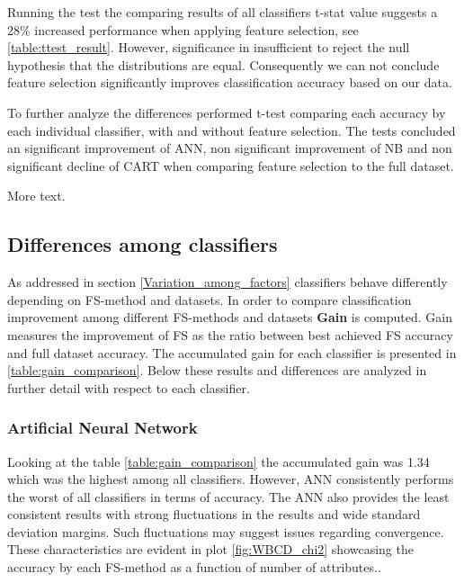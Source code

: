 

Running the test the comparing results of all classifiers t-stat value suggests a 28\% increased performance when applying feature selection, see \ref{table:ttest_result}. However, significance in insufficient to reject the null hypothesis that the distributions are equal. Consequently we can not conclude feature selection significantly improves classification accuracy based on our data.

To further analyze the differences performed t-test comparing each accuracy by each individual classifier, with and without feature selection. The tests concluded an significant improvement of ANN, non significant improvement of NB and non significant decline of CART when comparing feature selection to the full dataset.

More text.

\subsection{Differences among classifiers}

As addressed in section \ref{Variation_among_factors} classifiers behave differently depending on FS-method and datasets.
In order to compare classification improvement among different FS-methods and datasets \textbf{Gain} is computed. Gain measures the improvement of FS as the ratio between best achieved FS accuracy and full dataset accuracy. The accumulated gain for each classifier is presented in \ref{table:gain_comparison}. Below these results and differences are analyzed in further detail with respect to each classifier.

\begin{table}[hp]
  
  \caption[]%
  {{\small Ranking of which classifiers gained most accuracy when comparing feature selection to full dataset.}}
  \label{table:gain_comparison}
\end{table}

\subsubsection{Artificial Neural Network}

Looking at the table \ref{table:gain_comparison} the accumulated gain was 1.34 which was the highest among all classifiers. However, ANN consistently performs the worst of all classifiers in terms of accuracy. The ANN also provides the least consistent results with strong fluctuations in the results and wide standard deviation margins. Such fluctuations may suggest issues regarding convergence. These characteristics are evident in plot \ref{fig:WBCD_chi2} showcasing the accuracy by each FS-method as a function of number of attributes..

